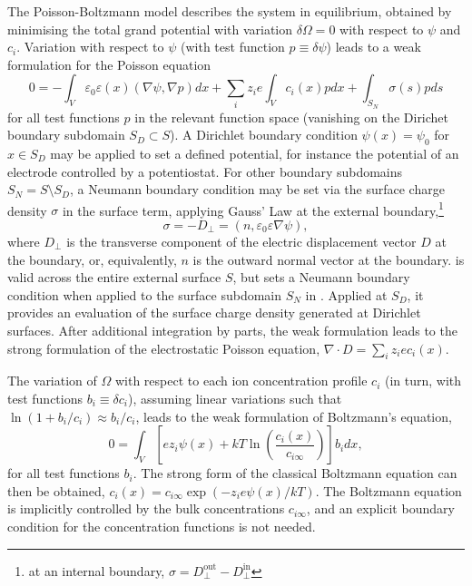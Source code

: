 The Poisson-Boltzmann model describes the system in equilibrium,
obtained by minimising the total grand potential with variation
$\delta\Omega=0$ with respect to $\psi$ and $c_i$. Variation with
respect to $\psi$ (with test function $p \equiv \delta \psi$) leads to a weak formulation
for the Poisson equation
\begin{equation}
    0 = -\int_{V} \varepsilon_{0}\varepsilon(x) (\nabla\psi,\nabla p) dx + \sum_{i}z_i e \int_{V} c_{i}(x) p dx + \int_{S_{N}} \sigma(s) p ds
    \label{weak_Poisson}
\end{equation}
for all test functions $p$ in the relevant function space (vanishing
on the Dirichet boundary subdomain $S_{D} \subset S$).  A Dirichlet boundary
condition $\psi(x)=\psi_{0}$ for $x \in S_{D}$ may be applied to set a defined potential,
for instance the potential of an  electrode controlled by a
potentiostat. For other boundary subdomains $S_{N} = S \setminus
S_{D}$, a Neumann boundary condition may be set via the surface
charge density $\sigma$ in the surface term, applying Gauss' Law at
the external boundary,\footnote{at an internal boundary, $\sigma=D^{\text{out}}_{\perp}-D^{\text{in}}_{\perp}$}
\begin{equation}
  \sigma = -D_{\perp} = (n, \varepsilon_{0}\varepsilon\nabla \psi),
  \label{surface_charge_gauss}
\end{equation}
where $D_{\perp}$ is the transverse component of the electric
displacement vector $D$ at the boundary, or, equivalently, $n$ is the
outward normal vector at the boundary. 
is valid across the entire  external surface $S$, but sets a Neumann
boundary condition when applied to the surface subdomain
$S_{N}$ in . Applied at $S_{D}$, it provides an
evaluation of the surface charge density generated at Dirichlet surfaces.
 After additional
integration by parts, the weak formulation  leads to the strong
formulation of the electrostatic Poisson equation,
$\nabla\cdot D = \sum_i z_i e c_{i}(x)$.

The variation of $\Omega$ with
respect to each ion concentration profile $c_i$ (in turn, with test
functions $b_i\equiv \delta c_i$), assuming linear variations such that
$\ln(1+b_i/c_i)\approx b_i/c_i$, leads to the weak formulation of Boltzmann's
equation,
\begin{equation}
    0 = \int_{V} \left[ e z_i \psi(x)
    + kT \ln\left(\frac{c_i(x)}{c_{i\infty}}\right)
  \right] b_i dx,
    \label{weak_Boltzmann}
\end{equation}
for all test functions $b_i$. The strong form of the classical
Boltzmann equation can then be obtained, $c_i(x)=c_{i\infty}\exp(-z_i
e \psi(x)/kT)$.  The Boltzmann equation is implicitly controlled by
the bulk concentrations $c_{i\infty}$, and an explicit boundary condition
for the concentration functions is not needed.

